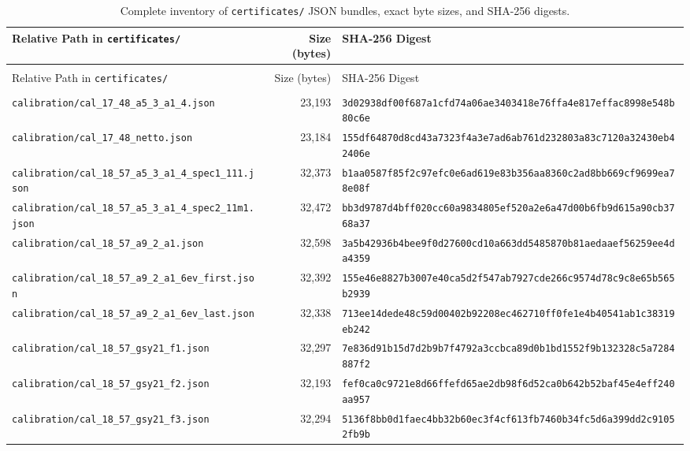 \documentclass[11pt,reqno]{amsart}
\theoremstyle{definition}
\theoremstyle{remark}
\numberwithin{equation}{section}
\numberwithin{table}{section}
\begin{document}
{\tiny
\setlength{\tabcolsep}{3.5pt}
\begin{longtable}{@{}>{\raggedright\arraybackslash}p{1.90in}r>{\raggedright\arraybackslash}p{3.35in}@{}}
\caption{Complete inventory of \nolinkurl{certificates/} JSON bundles, exact byte sizes, and SHA-256 digests.}\label{tab:cert_sha256}\\
\toprule
Relative Path in \texttt{certificates/} & Size (bytes) & SHA-256 Digest \\
\midrule
\endfirsthead
\multicolumn{3}{@{}l}{\scriptsize\emph{Table~\ref{tab:cert_sha256} (continued)}}\\
\toprule
Relative Path in \texttt{certificates/} & Size (bytes) & SHA-256 Digest \\
\midrule
\endhead
\midrule
\multicolumn{3}{r@{}}{\scriptsize\emph{Continued on next page}}\\
\endfoot
\bottomrule
\endlastfoot
\nolinkurl{calibration/cal_17_48_a5_3_a1_4.json} & 23,193 & \nolinkurl{3d02938df00f687a1cfd74a06ae3403418e76ffa4e817effac8998e548b80c6e} \\
\nolinkurl{calibration/cal_17_48_netto.json} & 23,184 & \nolinkurl{155df64870d8cd43a7323f4a3e7ad6ab761d232803a83c7120a32430eb42406e} \\
\nolinkurl{calibration/cal_18_57_a5_3_a1_4_spec1_111.json} & 32,373 & \nolinkurl{b1aa0587f85f2c97efc0e6ad619e83b356aa8360c2ad8bb669cf9699ea78e08f} \\
\nolinkurl{calibration/cal_18_57_a5_3_a1_4_spec2_11m1.json} & 32,472 & \nolinkurl{bb3d9787d4bff020cc60a9834805ef520a2e6a47d00b6fb9d615a90cb3768a37} \\
\nolinkurl{calibration/cal_18_57_a9_2_a1.json} & 32,598 & \nolinkurl{3a5b42936b4bee9f0d27600cd10a663dd5485870b81aedaaef56259ee4da4359} \\
\nolinkurl{calibration/cal_18_57_a9_2_a1_6ev_first.json} & 32,392 & \nolinkurl{155e46e8827b3007e40ca5d2f547ab7927cde266c9574d78c9c8e65b565b2939} \\
\nolinkurl{calibration/cal_18_57_a9_2_a1_6ev_last.json} & 32,338 & \nolinkurl{713ee14dede48c59d00402b92208ec462710ff0fe1e4b40541ab1c38319eb242} \\
\nolinkurl{calibration/cal_18_57_gsy21_f1.json} & 32,297 & \nolinkurl{7e836d91b15d7d2b9b7f4792a3ccbca89d0b1bd1552f9b132328c5a7284887f2} \\
\nolinkurl{calibration/cal_18_57_gsy21_f2.json} & 32,193 & \nolinkurl{fef0ca0c9721e8d66ffefd65ae2db98f6d52ca0b642b52baf45e4eff240aa957} \\
\nolinkurl{calibration/cal_18_57_gsy21_f3.json} & 32,294 & \nolinkurl{5136f8bb0d1faec4bb32b60ec3f4cf613fb7460b34fc5d6a399dd2c91052fb9b} \\

\end{longtable}}
\end{document}
